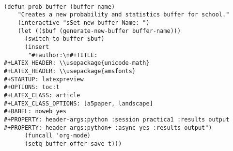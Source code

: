 \documentclass[11pt]{article}
\begin{document}
\begin{verbatim}

(defun prob-buffer (buffer-name)
    "Creates a new probability and statistics buffer for school."
    (interactive "sSet new buffer Name: ")
    (let (($buf (generate-new-buffer buffer-name)))
      (switch-to-buffer $buf)
      (insert
       "#+author:\n#+TITLE:
#+LATEX_HEADER: \\usepackage{unicode-math}
#+LATEX_HEADER: \\usepackage{amsfonts}
#+STARTUP: latexpreview
#+OPTIONS: toc:t
#+LATEX_CLASS: article
#+LATEX_CLASS_OPTIONS: [a5paper, landscape]
#+BABEL: noweb yes
#+PROPERTY: header-args:python :session practica1 :results output
#+PROPERTY: header-args:python+ :async yes :results output")
      (funcall 'org-mode)
      (setq buffer-offer-save t)))


\end{verbatim}
\end{document}
